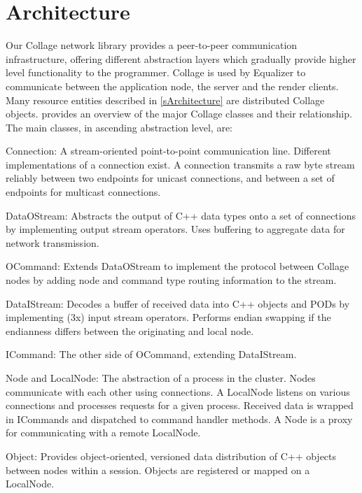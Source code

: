 \section{Architecture}

Our Collage network library provides a peer-to-peer communication
infrastructure, offering different abstraction layers which gradually provide
higher level functionality to the programmer. Collage is used by Equalizer to
communicate between the application node, the server and the render clients.
Many resource entities described in \cref{sArchitecture} are distributed
Collage objects.  provides an overview of the major Collage
classes and their relationship. The main classes, in ascending abstraction
level, are:

\begin{compactdesc}

\item[Connection:] A stream-oriented point-to-point communication line.
Different implementations of a connection exist. A connection transmits a raw
byte stream reliably between two endpoints for unicast connections, and between
a set of endpoints for multicast connections.

\item[DataOStream:] Abstracts the output of C++ data types onto a set of
  connections by implementing output stream operators. Uses buffering to
  aggregate data for network transmission.
\item[OCommand:] Extends DataOStream to implement the protocol between Collage
  nodes by adding node and command type routing information to the stream.
\item[DataIStream:] Decodes a buffer of received data into C++ objects and PODs
  by implementing (3x) input stream operators. Performs endian swapping if the
  endianness differs between the originating and local node.
\item[ICommand:] The other side of OCommand, extending DataIStream.
\item[Node and LocalNode:] The abstraction of a process in the cluster. Nodes
  communicate with each other using connections. A LocalNode listens on various
  connections and processes requests for a given process. Received data is
  wrapped in ICommands and dispatched to command handler methods. A Node is a
  proxy for communicating with a remote LocalNode.
\item[Object:] Provides object-oriented, versioned data distribution of C++
  objects between nodes within a session. Objects are registered or mapped on a
  Local\-Node.
\end{compactdesc}


